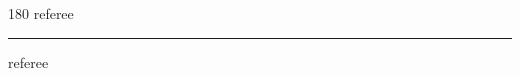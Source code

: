 
\begin{frame}
\begin{center}
\begin{turn}{180}
{\fontsize{2.5cm}{1em}\selectfont referee}
\end{turn}
\vspace{1em}\par  
\hrule
\vspace{1em}\par  
{\fontsize{2.5cm}{1em}\selectfont referee}
\end{center}
\end{frame}
